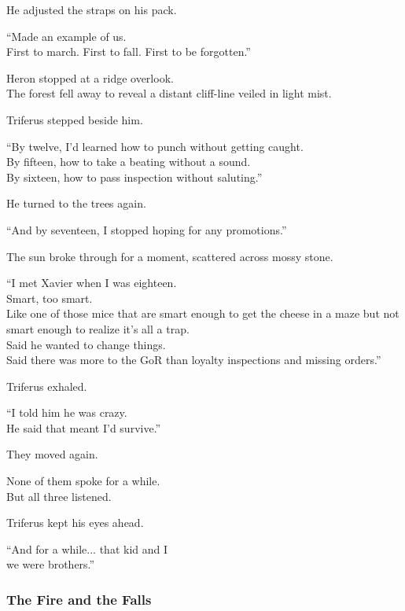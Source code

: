 \documentclass[12pt]{article}
\begin{document}
He adjusted the straps on his pack.

“Made an example of us.\\
First to march. First to fall. First to be forgotten.”

\vspace{1em}

Heron stopped at a ridge overlook.\\
The forest fell away to reveal a distant cliff-line veiled in light mist.

Triferus stepped beside him.

“By twelve, I’d learned how to punch without getting caught.\\
By fifteen, how to take a beating without a sound.\\
By sixteen, how to pass inspection without saluting.”

He turned to the trees again.

“And by seventeen, I stopped hoping for any promotions.”

\vspace{1em}

The sun broke through for a moment, scattered across mossy stone.

“I met Xavier when I was eighteen.\\
Smart, too smart.\\
Like one of those mice that are smart enough to get the cheese in a maze but not smart enough to realize it's all a trap.\\
Said he wanted to change things.\\
Said there was more to the GoR than loyalty inspections and missing orders.”

Triferus exhaled.

“I told him he was crazy.\\
He said that meant I’d survive.”

\vspace{1em}

They moved again.

None of them spoke for a while.\\
But all three listened.

Triferus kept his eyes ahead.

“And for a while... that kid and I\\
we were brothers.”

\dotfill

\subsubsection*{The Fire and the Falls}
\end{document}
